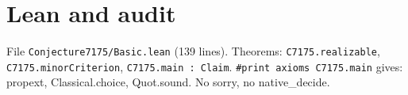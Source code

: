 \documentclass[11pt]{article}
\begin{document}
\section*{Lean and audit}
File \texttt{Conjecture7175/Basic.lean} (139 lines). Theorems: \texttt{C7175.realizable}, \texttt{C7175.minorCriterion}, \texttt{C7175.main : Claim}. \texttt{\#print axioms C7175.main} gives: propext, Classical.choice, Quot.sound. No sorry, no native\_decide.
\end{document}
